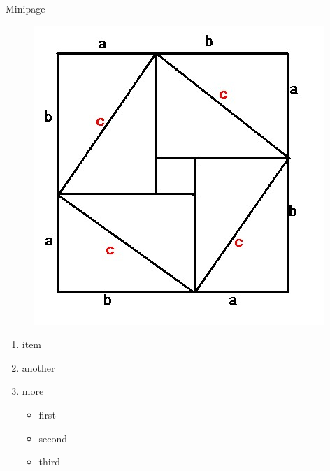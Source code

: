 \begin{frame}{Minipage}
    \begin{minipage}{0.5\linewidth}
        \begin{figure}[h]
            \includegraphics[width=\textwidth]{imgs/pythagorean.jpg}
        \end{figure}
    \end{minipage}%
    \hfill
    \begin{minipage}{0.4\linewidth}
        \begin{enumerate}
            \item item
            \item another
            \item more
            \begin{itemize}
                \item first
                \item second
                \item third
            \end{itemize}
        \end{enumerate}
    \end{minipage}
\end{frame}

